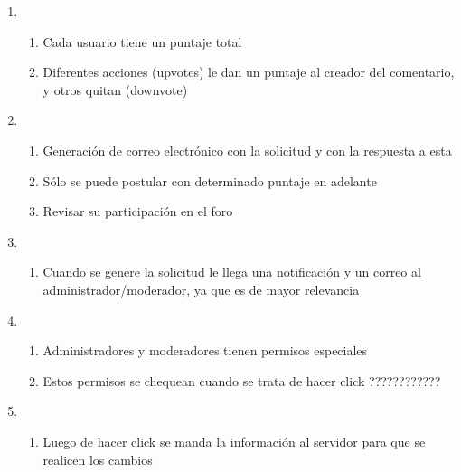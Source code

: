 \documentclass[12pt, letterpaper, notitlepage]{article}
\begin{document}
\begin{enumerate}
	\item {}
		\begin{enumerate}
			\item Cada usuario tiene un puntaje total
			\item Diferentes acciones (upvotes) le dan un puntaje al creador del comentario, y otros quitan (downvote)	
		\end{enumerate}
		
	\item {}
		\begin{enumerate}
			\item Generación de correo electrónico con la solicitud y con la respuesta a esta
			\item Sólo se puede postular con determinado puntaje en adelante
			\item Revisar su participación en el foro
		\end{enumerate}
		
	\item {}
		\begin{enumerate}
			\item Cuando se genere la solicitud le llega una notificación y un correo al administrador/moderador, ya que es de mayor relevancia
		\end{enumerate}
		
	\item {}
		\begin{enumerate}
			\item Administradores y moderadores tienen permisos especiales
			\item Estos permisos se chequean cuando se trata de hacer click ????????????
		\end{enumerate}
	
	\item {}
		\begin{enumerate}
			\item Luego de hacer click se manda la información al servidor para que se realicen los cambios
		\end{enumerate}
	

\end{enumerate}
\end{document}
